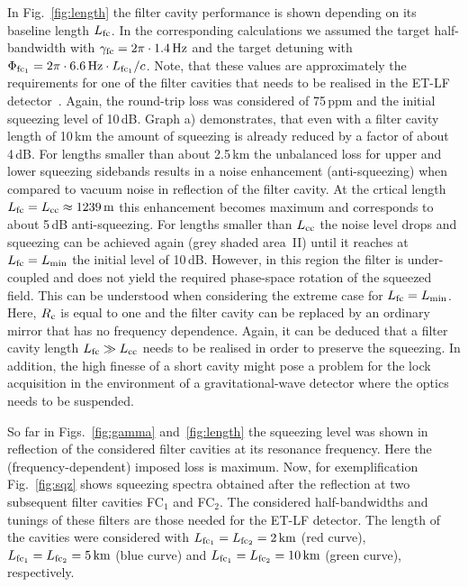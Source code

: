 In Fig.~\ref{fig:length}  the filter cavity performance is shown
depending on its baseline length $L_{\rm fc}$. In the
corresponding calculations we assumed the target half-bandwidth
with ${\gamma_{\rm fc} = 2\pi\cdot1.4\,{\rm Hz}}$ and the target detuning with
${\Phi_{\rm fc_1}= 2\pi\cdot 6.6\,{\rm Hz}\cdot L_{\rm fc_1}/c}$.
Note, that these values are approximately the requirements for one of the filter
cavities that needs to be realised in the ET-LF
detector~\cite{Hild2010a}. Again, the round-trip loss was
considered of 75\,ppm and the initial squeezing level of 10\,dB.  Graph a)
demonstrates, that even with a filter cavity length of 10\,km the
amount of squeezing  is already reduced by a factor of about
4\,dB. For lengths smaller than about 2.5\,km the unbalanced loss for upper and lower squeezing sidebands results in a noise enhancement (anti-squeezing) when compared to vacuum noise in reflection of the filter cavity.  At the crtical length $L_{\rm fc} = L_{\rm
cc}\approx1239\,\rm m$ this enhancement becomes maximum and corresponds to about 5\,dB anti-squeezing. For lengths smaller than $L_{\rm cc}$  the noise level drops and squeezing can be achieved again (grey shaded area~II) until it reaches at $L_{\rm fc} =
L_{\min}$ the initial level of 10\,dB. However, in this region the
filter is under-coupled and does not yield the required
phase-space rotation of the squeezed field. This can be understood
when considering the extreme case for $L_{\rm fc} = L_{\min}$.
Here, $R_{\rm c}$ is equal to one and  the filter cavity can be
replaced by  an ordinary mirror that has no frequency dependence.
Again, it can be deduced that a filter cavity length  $L_{\rm fc}
\gg L_{\rm cc}$ needs to be realised in order to preserve the
squeezing. In addition, the high finesse of a short cavity might
pose a problem for the lock acquisition in the environment of a gravitational-wave detector where the optics
needs to be suspended.

So far in Figs.~\ref{fig:gamma} and~\ref{fig:length} the squeezing level was shown in reflection of the considered filter cavities at its resonance frequency. Here the  (frequency-dependent) imposed loss is maximum. Now, for  exemplification
Fig.~\ref{fig:sqz} shows squeezing spectra obtained after the
reflection at two subsequent filter cavities FC$_1$ and FC$_2$.
The considered  half-bandwidths and tunings of these filters are
those needed for the ET-LF detector. The length of the cavities
were considered with  $L_{\rm fc_1}=L_{\rm fc_2}=2\,{\rm km}$ (red
curve), $L_{\rm fc_1}=L_{\rm fc_2}=5\,{\rm km}$ (blue curve) and
$L_{\rm fc_1}=L_{\rm fc_2}=10\,{\rm km}$ (green curve),
respectively.


